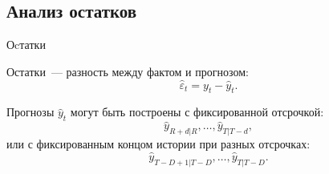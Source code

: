 \documentclass[10pt,pdf,utf8,hyperref={unicode},aspectratio=169]{beamer}
\begin{document}


\subsection{Анализ остатков}
\begin{frame}{Оcтатки}

	Остатки~--- разность между фактом и прогнозом:
	$$\hat{\varepsilon}_t = y_t - \hat{y}_t.$$
	
	\bigskip
	
	Прогнозы $\hat{y}_t$ могут быть построены с фиксированной отсрочкой:
	$$\hat{y}_{R+d|R}, \dots, \hat{y}_{T|T-d},$$
	или с фиксированным концом истории при разных отсрочках:
	$$\hat{y}_{T-D+1|T-D}, \dots,  \hat{y}_{T|T-D}.$$
\end{frame}
\end{document}
